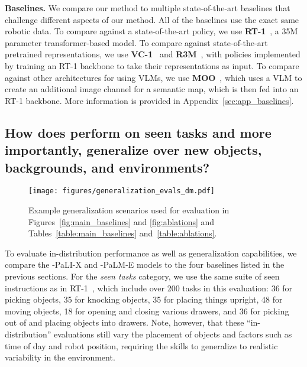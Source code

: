 \textbf{Baselines.} We compare our method to multiple state-of-the-art baselines that challenge different aspects of our method. All of the baselines use the exact same robotic data. 
To compare against a state-of-the-art policy, we use \textbf{RT-1}~\citep{brohan2022rt}, a 35M parameter transformer-based model.
To compare against state-of-the-art pretrained representations, we use \textbf{VC-1}~\citep{majumdar2023vc1} and \textbf{R3M}~\citep{nair2022r3m}, with policies implemented by training an RT-1 backbone to take their representations as input.
To compare against other architectures for using VLMs, we use \textbf{MOO}~\citep{stone2023open}, which uses a VLM to create an additional image channel for a semantic map, which is then fed into an RT-1 backbone.
More information is provided in Appendix~\ref{sec:app_baselines}.

\subsection{How does \methodname perform on seen tasks and more importantly, generalize over new objects, backgrounds, and environments?}\label{sec:quant}

\begin{figure}[h]
\vspace{-0.3cm}
    \centering
    \texttt{[image: figures/generalization\_evals\_dm.pdf]}
    \vspace{-0.3cm}
    \caption{Example generalization scenarios used for evaluation in Figures~\ref{fig:main_baselines} and \ref{fig:ablations} and  Tables~\ref{table:main_baselines} and~\ref{table:ablations}.}
    \label{fig:generalization_evals}
\end{figure}

To evaluate in-distribution
performance as well as generalization capabilities, we compare the \methodname-PaLI-X and \methodname-PaLM-E models to the four baselines listed in the previous sections. For the \textit{seen tasks} category, we use the same suite of seen instructions as in RT-1~\citep{brohan2022rt}, which include over 200 tasks in this evaluation: 36 for picking objects, 35 for knocking objects, 35 for placing things upright, 48 for moving objects, 18 for opening and closing various drawers, and 36 for picking out of and placing objects into drawers.
Note, however, that these ``in-distribution'' evaluations still vary the  placement of objects and factors such as time of day and robot position, requiring the skills to generalize to realistic variability in the environment.

